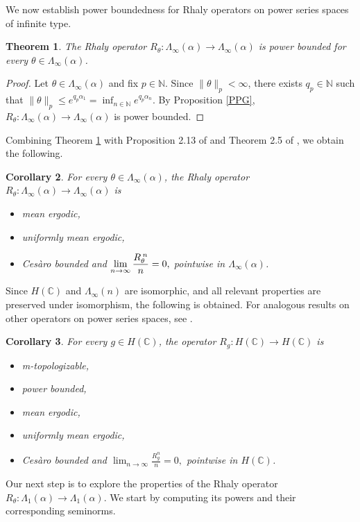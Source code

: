 \documentclass{birkjour}
\newtheorem{thm}{Theorem}[section]
\newtheorem{cor}[thm]{Corollary}
\theoremstyle{definition}
\theoremstyle{remark}
\numberwithin{equation}{section}
\begin{document}
We now establish power boundedness for Rhaly operators on power series 
spaces of infinite type.

\begin{thm}\label{PBIT} The Rhaly operator $R_{\theta}:\Lambda_{\infty}(\alpha)\to \Lambda_{\infty}(\alpha)$ is power bounded for every $\theta\in \Lambda_{\infty}(\alpha)$.
\end{thm}
\begin{proof}
Let $\theta\in \Lambda_{\infty}(\alpha)$ and fix $p\in \mathbb{N}$.  Since 
$\|\theta\|_{p}<\infty$, there exists $q_p\in\mathbb{N}$ such that 
$\|\theta\|_p\leq e^{q_p\alpha_1}=\inf_{n\in\mathbb{N}}e^{q_p\alpha_n}$. 
By Proposition \ref{PPG}, $R_{\theta}:\Lambda_{\infty}(\alpha)\to
\Lambda_{\infty}(\alpha)$ is power bounded.
\end{proof}

Combining Theorem \ref{PBIT} with Proposition 2.13 of \cite{ABR} and Theorem 2.5 of \cite{K1}, 
we obtain the following.


 \begin{cor}\label{PBITC} For every $\theta\in \Lambda_{\infty}(\alpha)$,
 the Rhaly operator $R_{\theta}:\Lambda_{\infty}(\alpha)\to \Lambda_{\infty}(\alpha)$ is
\begin{itemize}
    \item[i.] mean ergodic,
    \item[ii.] uniformly mean ergodic,
    \item[iii.] Ces\`{a}ro bounded and $\displaystyle \lim_{n\to \infty} \frac{R_{\theta}^{\hspace{0.025in}n}}{n}=0,$ pointwise in $\Lambda_{\infty}(\alpha)$.
\end{itemize}
 \end{cor}

Since $H(\mathbb{C})$ and $\Lambda_{\infty}(n)$ are isomorphic, and all relevant properties 
are preserved under isomorphism, the following is obtained. 
For analogous results on other operators on power series spaces, 
see \cite{A5, K1}.

\begin{cor} For every $g\in H(\mathbb{C})$, the operator $R_{g}:H(\mathbb{C})\to H(\mathbb{C})$ is
\begin{itemize}
\item[i.] m-topologizable,
\item[ii.] power bounded,
\item[iii.] mean ergodic,
\item[iv.] uniformly mean ergodic,
\item[v.] Ces\`{a}ro bounded and $\displaystyle \lim_{n\to \infty} \frac{R^{n}_{g}}{n}=0,$ pointwise in $H(\mathbb{C})$.
\end{itemize}
\end{cor}
Our next step is to explore the properties of the Rhaly operator $R_{\theta}:\Lambda_{1}(\alpha)\to \Lambda_{1}(\alpha)$. We start by computing its powers and their corresponding seminorms. 
\end{document}
